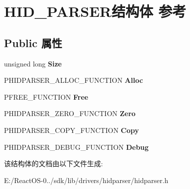 \hypertarget{struct_h_i_d___p_a_r_s_e_r}{}\section{H\+I\+D\+\_\+\+P\+A\+R\+S\+E\+R结构体 参考}
\label{struct_h_i_d___p_a_r_s_e_r}
\subsection*{Public 属性}
\begin{DoxyCompactItemize}
\item 
\mbox{\label{struct_h_i_d___p_a_r_s_e_r_af001df288a6f624d86c56118a333b7dd}} 
unsigned long {\bfseries Size}
\item 
\mbox{\label{struct_h_i_d___p_a_r_s_e_r_a2e444a2dec463824cf75d8bfdcbb0105}} 
P\+H\+I\+D\+P\+A\+R\+S\+E\+R\+\_\+\+A\+L\+L\+O\+C\+\_\+\+F\+U\+N\+C\+T\+I\+ON {\bfseries Alloc}
\item 
\mbox{\label{struct_h_i_d___p_a_r_s_e_r_a7b732617fe624086b81dd4a9fe546380}} 
P\+F\+R\+E\+E\+\_\+\+F\+U\+N\+C\+T\+I\+ON {\bfseries Free}
\item 
\mbox{\label{struct_h_i_d___p_a_r_s_e_r_a419f033b7ea6f6ff52bb77b1a9884878}} 
P\+H\+I\+D\+P\+A\+R\+S\+E\+R\+\_\+\+Z\+E\+R\+O\+\_\+\+F\+U\+N\+C\+T\+I\+ON {\bfseries Zero}
\item 
\mbox{\label{struct_h_i_d___p_a_r_s_e_r_a9255f499943747bcbc5519ce8351a229}} 
P\+H\+I\+D\+P\+A\+R\+S\+E\+R\+\_\+\+C\+O\+P\+Y\+\_\+\+F\+U\+N\+C\+T\+I\+ON {\bfseries Copy}
\item 
\mbox{\label{struct_h_i_d___p_a_r_s_e_r_a13be3eadeccf2fb7d78638df4ebfac9a}} 
P\+H\+I\+D\+P\+A\+R\+S\+E\+R\+\_\+\+D\+E\+B\+U\+G\+\_\+\+F\+U\+N\+C\+T\+I\+ON {\bfseries Debug}
\end{DoxyCompactItemize}


该结构体的文档由以下文件生成\+:\begin{DoxyCompactItemize}
\item 
E\+:/\+React\+O\+S-\/0../sdk/lib/drivers/hidparser/hidparser.\+h\end{DoxyCompactItemize}
